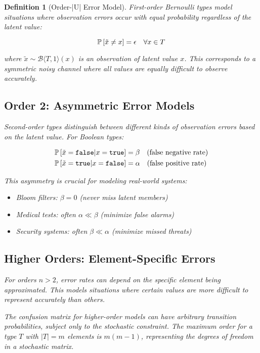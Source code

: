\documentclass[11pt,final,hidelinks]{article}
\newtheorem{definition}[theorem]{Definition}
\newcommand{\bernoulli}[2]{\mathcal{B}\langle #1, #2 \rangle}
\begin{document}
\begin{definition}[Order-|U| Error Model]
First-order Bernoulli types model situations where observation errors occur with equal probability regardless of the latent value:

\begin{equation}
\mathbb{P}\left[\tilde{x} \neq x\right] = \epsilon \quad \forall x \in T
\end{equation}

where $\tilde{x} \sim \bernoulli{T}{1}(x)$ is an observation of latent value $x$. This corresponds to a symmetric noisy channel where all values are equally difficult to observe accurately.

\subsection{Order 2: Asymmetric Error Models}

Second-order types distinguish between different kinds of observation errors based on the latent value. For Boolean types:

\begin{align}
\mathbb{P}\left[\tilde{x} = \mathtt{false} | x = \mathtt{true}\right] &= \beta \quad \text{(false negative rate)} \\
\mathbb{P}\left[\tilde{x} = \mathtt{true} | x = \mathtt{false}\right] &= \alpha \quad \text{(false positive rate)}
\end{align}

This asymmetry is crucial for modeling real-world systems:
\begin{itemize}
    \item Bloom filters: $\beta = 0$ (never miss latent members)
    \item Medical tests: often $\alpha \ll \beta$ (minimize false alarms)
    \item Security systems: often $\beta \ll \alpha$ (minimize missed threats)
\end{itemize}

\subsection{Higher Orders: Element-Specific Errors}

For orders $n > 2$, error rates can depend on the specific element being approximated. This models situations where certain values are more difficult to represent accurately than others.

The confusion matrix for higher-order models can have arbitrary transition probabilities, subject only to the stochastic constraint. The maximum order for a type $T$ with $|T| = m$ elements is $m(m-1)$, representing the degrees of freedom in a stochastic matrix.


\end{definition}
\end{document}
